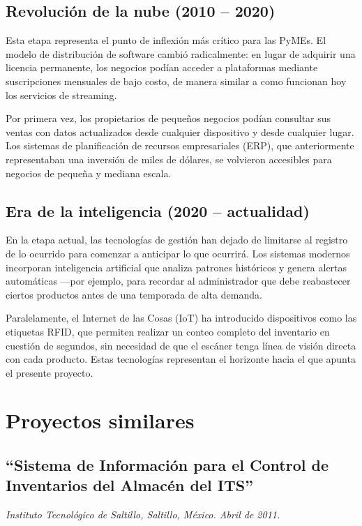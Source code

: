 \subsection{Revolución de la nube (2010 -- 2020)}

Esta etapa representa el punto de inflexión más crítico para las PyMEs. El modelo de distribución de software cambió radicalmente: en lugar de adquirir una licencia permanente, los negocios podían acceder a plataformas mediante suscripciones mensuales de bajo costo, de manera similar a como funcionan hoy los servicios de streaming.

Por primera vez, los propietarios de pequeños negocios podían consultar sus ventas con datos actualizados desde cualquier dispositivo y desde cualquier lugar. Los sistemas de planificación de recursos empresariales (ERP), que anteriormente representaban una inversión de miles de dólares, se volvieron accesibles para negocios de pequeña y mediana escala.

\subsection{Era de la inteligencia (2020 -- actualidad)}

En la etapa actual, las tecnologías de gestión han dejado de limitarse al registro de lo ocurrido para comenzar a anticipar lo que ocurrirá. Los sistemas modernos incorporan inteligencia artificial que analiza patrones históricos y genera alertas automáticas ---por ejemplo, para recordar al administrador que debe reabastecer ciertos productos antes de una temporada de alta demanda.

Paralelamente, el Internet de las Cosas (IoT) ha introducido dispositivos como las etiquetas RFID, que permiten realizar un conteo completo del inventario en cuestión de segundos, sin necesidad de que el escáner tenga línea de visión directa con cada producto. Estas tecnologías representan el horizonte hacia el que apunta el presente proyecto.



\section{Proyectos similares}

\subsection{``Sistema de Información para el Control de Inventarios del Almacén del ITS''}
\textit{Instituto Tecnológico de Saltillo, Saltillo, México. Abril de 2011.}

